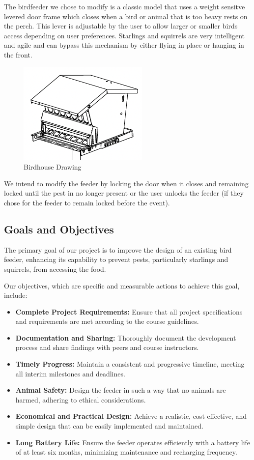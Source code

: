 \documentclass[12pt,a4paper]{article}
\begin{document}
The birdfeeder we chose to modify is a classic model that uses a weight sensitve levered door frame which closes when a bird or animal that is too heavy rests on the perch. This lever is adjustable by the user to allow larger or smaller birds access depending on user preferences. Starlings and squirrels are very intelligent and agile and can bypass this mechanism by either flying in place or hanging in the front. 

\begin{figure}[h]
    \centering
    \includegraphics{images/birdhouse_drawing.png}
    \caption{Birdhouse Drawing \cite{woodlink}}
\end{figure}

We intend to modify the feeder by locking the door when it closes and remaining locked until the pest in no longer present or the user unlocks the feeder (if they chose for the feeder to remain locked before the event).

\subsection{Goals and Objectives}

The primary goal of our project is to improve the design of an existing bird feeder, enhancing its capability to prevent pests, particularly starlings and squirrels, from accessing the food.

Our objectives, which are specific and measurable actions to achieve this goal, include:
\begin{itemize}
    \item \textbf{Complete Project Requirements:} Ensure that all project specifications and requirements are met according to the course guidelines.
    \item \textbf{Documentation and Sharing:} Thoroughly document the development process and share findings with peers and course instructors.
    \item \textbf{Timely Progress:} Maintain a consistent and progressive timeline, meeting all interim milestones and deadlines.
    \item \textbf{Animal Safety:} Design the feeder in such a way that no animals are harmed, adhering to ethical considerations.
    \item \textbf{Economical and Practical Design:} Achieve a realistic, cost-effective, and simple design that can be easily implemented and maintained.
    \item \textbf{Long Battery Life:} Ensure the feeder operates efficiently with a battery life of at least six months, minimizing maintenance and recharging frequency.
\end{itemize}
\end{document}
